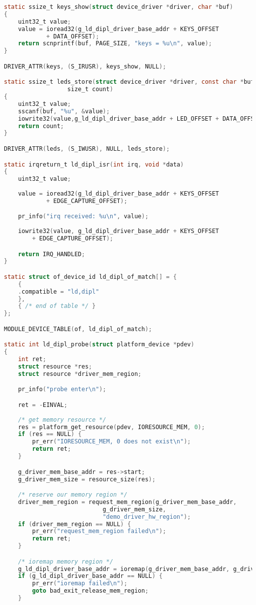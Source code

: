 \begin{lstlisting}[language=C]
static ssize_t keys_show(struct device_driver *driver, char *buf)
{
	uint32_t value;
	value = ioread32(g_ld_dipl_driver_base_addr + KEYS_OFFSET
			+ DATA_OFFSET);
	return scnprintf(buf, PAGE_SIZE, "keys = %u\n", value);
}

DRIVER_ATTR(keys, (S_IRUSR), keys_show, NULL);

static ssize_t leds_store(struct device_driver *driver, const char *buf,
			      size_t count)
{
	uint32_t value;
	sscanf(buf, "%u", &value);
	iowrite32(value,g_ld_dipl_driver_base_addr + LED_OFFSET + DATA_OFFSET);
	return count;
}

DRIVER_ATTR(leds, (S_IWUSR), NULL, leds_store);

static irqreturn_t ld_dipl_isr(int irq, void *data)
{
	uint32_t value;
	
	value = ioread32(g_ld_dipl_driver_base_addr + KEYS_OFFSET
			+ EDGE_CAPTURE_OFFSET);

	pr_info("irq received: %u\n", value);
	
	iowrite32(value, g_ld_dipl_driver_base_addr + KEYS_OFFSET
		+ EDGE_CAPTURE_OFFSET);

	return IRQ_HANDLED;
}

static struct of_device_id ld_dipl_of_match[] = {
	{
	.compatible = "ld,dipl"
	},
	{ /* end of table */ }
};

MODULE_DEVICE_TABLE(of, ld_dipl_of_match);

static int ld_dipl_probe(struct platform_device *pdev)
{
	int ret;
	struct resource *res;
	struct resource *driver_mem_region;

	pr_info("probe enter\n");

	ret = -EINVAL;
	
	/* get memory resource */
	res = platform_get_resource(pdev, IORESOURCE_MEM, 0);
	if (res == NULL) {
		pr_err("IORESOURCE_MEM, 0 does not exist\n");
		return ret;
	}

	g_driver_mem_base_addr = res->start;
	g_driver_mem_size = resource_size(res);

	/* reserve our memory region */
	driver_mem_region = request_mem_region(g_driver_mem_base_addr,
						    g_driver_mem_size,
						    "demo_driver_hw_region");
	if (driver_mem_region == NULL) {
		pr_err("request_mem_region failed\n");
		return ret;
	}

	/* ioremap memory region */
	g_ld_dipl_driver_base_addr = ioremap(g_driver_mem_base_addr, g_driver_mem_size);
	if (g_ld_dipl_driver_base_addr == NULL) {
		pr_err("ioremap failed\n");
		goto bad_exit_release_mem_region;
	}


\end{lstlisting}
